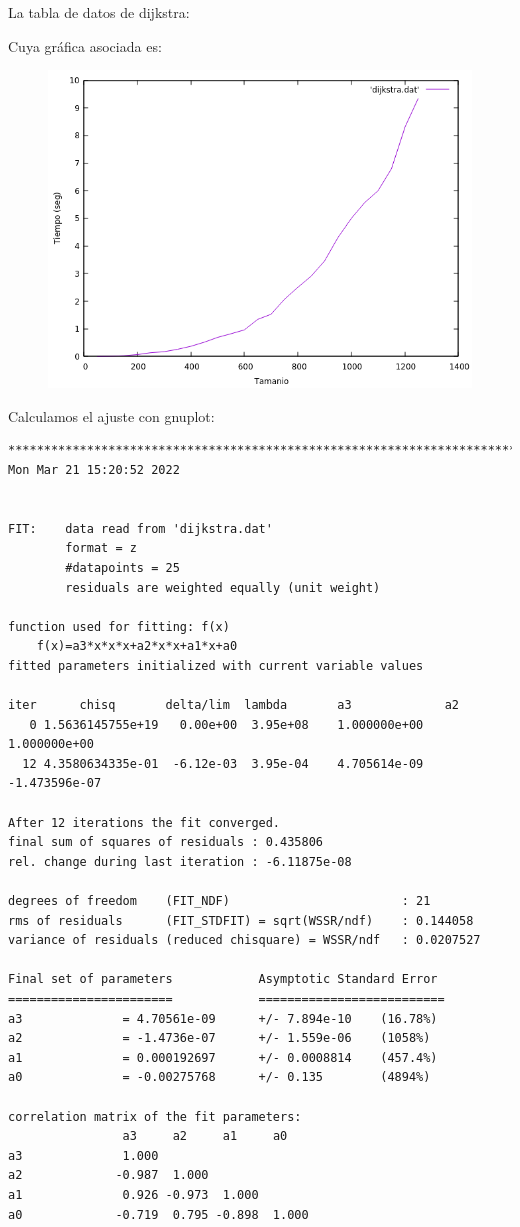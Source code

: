 \documentclass[12pt, spanish]{article}
\begin{document}
La tabla de datos de dijkstra:



Cuya gráfica asociada es:
\begin{figure}[H]
  \centering
  \includegraphics[scale = 0.7]{dijkstra.png}
\end{figure}

Calculamos el ajuste con gnuplot:
\begin{verbatim}
*************************************************************************
Mon Mar 21 15:20:52 2022


FIT:    data read from 'dijkstra.dat'
        format = z
        #datapoints = 25
        residuals are weighted equally (unit weight)

function used for fitting: f(x)
	f(x)=a3*x*x*x+a2*x*x+a1*x+a0
fitted parameters initialized with current variable values

iter      chisq       delta/lim  lambda       a3             a2
   0 1.5636145755e+19   0.00e+00  3.95e+08    1.000000e+00   1.000000e+00
  12 4.3580634335e-01  -6.12e-03  3.95e-04    4.705614e-09  -1.473596e-07

After 12 iterations the fit converged.
final sum of squares of residuals : 0.435806
rel. change during last iteration : -6.11875e-08

degrees of freedom    (FIT_NDF)                        : 21
rms of residuals      (FIT_STDFIT) = sqrt(WSSR/ndf)    : 0.144058
variance of residuals (reduced chisquare) = WSSR/ndf   : 0.0207527

Final set of parameters            Asymptotic Standard Error
=======================            ==========================
a3              = 4.70561e-09      +/- 7.894e-10    (16.78%)
a2              = -1.4736e-07      +/- 1.559e-06    (1058%)
a1              = 0.000192697      +/- 0.0008814    (457.4%)
a0              = -0.00275768      +/- 0.135        (4894%)

correlation matrix of the fit parameters:
                a3     a2     a1     a0
a3              1.000
a2             -0.987  1.000
a1              0.926 -0.973  1.000
a0             -0.719  0.795 -0.898  1.000
\end{verbatim}
\end{document}
